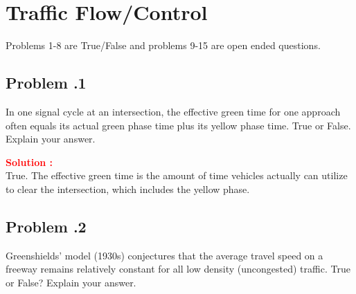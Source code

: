 \documentclass[12pt]{article}
\newcommand{\customsubsection}[1]{
  \subsection*{Problem \thesection.#1}
}
\begin{document}

\section{Traffic Flow/Control}
Problems 1-8 are True/False and problems 9-15 are open ended questions.



\customsubsection{1}
In one signal cycle at an intersection, the effective green time for one approach often equals its actual green phase time plus its yellow phase time. True or False. Explain your answer. 

 
\textbf{\textcolor{red}{Solution :}} \\
True. The effective green time is the amount of time vehicles actually can utilize to clear the intersection, which includes the yellow phase.
\newpage

\customsubsection{2}
Greenshields' model (1930s) conjectures that the average travel speed on a freeway remains relatively constant for all low density (uncongested) traffic.  True or False? Explain your answer. 
\end{document}
